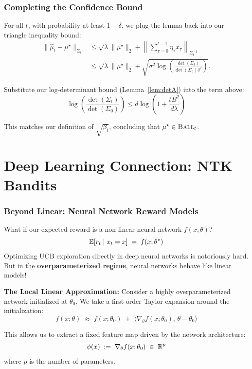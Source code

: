 \documentclass[aspectratio=169]{beamer}
\begin{document}
\begin{frame}\frametitle{Completing the Confidence Bound}

For all $t$, with probability at least $1-\delta$, we plug the lemma back into our triangle inequality bound:
\begin{align*}
\|\widehat \mu_t - \mu^\star\|_{\Sigma_t} 
&\leq \sqrt{\lambda}\|\mu^\star\|_2 + \left\| \sum_{\tau = 0}^{t-1} \eta_\tau x_\tau \right\|_{\Sigma_t^{-1}} \\
&\leq \sqrt{\lambda}\|\mu^\star\|_2 + \sqrt{\sigma^2\log\left(\frac{\det(\Sigma_t)}{\det(\Sigma_0) \delta^2} \right) }.
\end{align*} 

\pause
\vspace{0.4cm}
Substitute our log-determinant bound (Lemma~\ref{lem:detA}) into the term above:
\[
\log\left(\frac{\det(\Sigma_t)}{\det(\Sigma_0)}\right) \leq d\log\left( 1 + \frac{t B^2}{ d \lambda } \right)
\]

\vspace{0.2cm}
This matches our definition of $\sqrt{\beta_t}$, concluding that $\mu^\star \in \textsc{Ball}_t$.
\end{frame}

\section{Deep Learning Connection: NTK Bandits}

\begin{frame}\frametitle{Beyond Linear: Neural Network Reward Models}

What if our expected reward is a non-linear neural network $f(x; \theta)$? 
\[
\mathbb{E}[r_t \mid x_t=x] \;=\; f(x; \theta^\star)
\]
Optimizing UCB exploration directly in deep neural networks is notoriously hard. But in the \textbf{overparameterized regime}, neural networks behave like linear models!

\vspace{0.4cm}
\pause
\textbf{The Local Linear Approximation:}
Consider a highly overparameterized network initialized at $\theta_0$. We take a first-order Taylor expansion around the initialization:
\[
f(x; \theta) \;\approx\; f(x; \theta_0) \;+\; \langle \nabla_\theta f(x; \theta_0),\, \theta - \theta_0 \rangle
\]

\vspace{0.2cm}
\pause
This allows us to extract a \alert{fixed feature map} driven by the network architecture:
\[
\phi(x) \;:=\; \nabla_\theta f(x; \theta_0) \;\in\; \mathbb{R}^p
\]
where $p$ is the number of parameters.
\end{frame}
\end{document}
